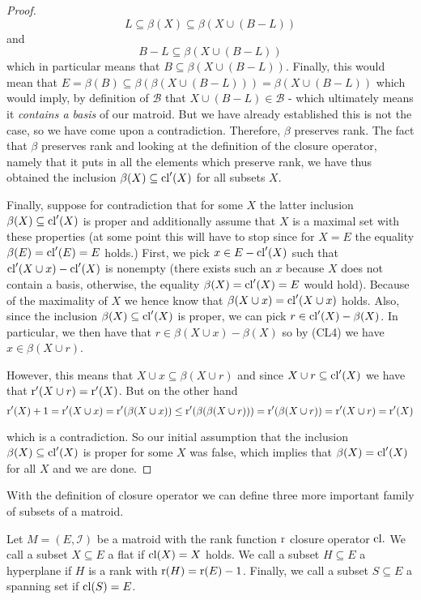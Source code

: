 \begin{proof}
$$L \subseteq \beta(X) \subseteq \beta(X \cup (B-L))$$ and $$B-L \subseteq \beta(X \cup (B-L))$$ which in particular means that $B \subseteq \beta(X \cup (B-L))$. Finally, this would mean that  
$E = \beta(B)\subseteq \beta(\beta(X \cup (B-L))) = \beta(X \cup (B-L))$ which would imply, by definition of $\mathcal{B}$ that $X \cup (B-L)
\in \mathcal{B}$ - which ultimately means it \textit{contains a basis} of our matroid. But we have already established this is not the case, so we have come upon a contradiction. Therefore, $\beta$ preserves rank.
The fact that $\beta$ preserves rank and looking at the definition of the closure operator, namely that it puts in all the elements which preserve rank, we have thus obtained the inclusion $\beta(X) \subseteq \mathrm{cl}'(X)$ for all subsets $X.$

Finally, suppose for contradiction that for some $X$ the latter inclusion $\beta(X) \subseteq \mathrm{cl}'(X)$ is proper and additionally assume that $X$ is a maximal set with these properties (at some point this will have to stop since for $X =E$ the equality $\beta(E) = \mathrm{cl}'(E) = E$ holds.) First, we pick $x \in E - \mathrm{cl}'(X)$ such that $\mathrm{cl}'(X\cup x) - \mathrm{cl}'(X)$ is nonempty (there exists such an $x$ because $X$ does not contain a basis, otherwise, the equality $\beta(X) = \mathrm{cl}'(X) = E$ would hold).
Because of the maximality of $X$ we hence know that $\beta(X\cup x) = \mathrm{cl}'(X \cup x)$ holds. Also, since the inclusion $\beta(X) \subseteq \mathrm{cl}'(X)$ is proper, we can pick $r \in \mathrm{cl}'(X) - \beta(X)$. In particular, we then have that $r \in \beta(X\cup x) - \beta(X)$ so by (CL4) we have $x \in \beta(X\cup r)$.

However, this means that $X \cup x \subseteq \beta(X\cup r)$ and since $X\cup r \subseteq \mathrm{cl}'(X)$ we have that $\operatorname{r}'(X\cup r) = 
\operatorname{r}'(X)$. But on the other hand $$\operatorname{r}'(X) + 1= \operatorname{r}'(X\cup x) = \operatorname{r}'(\beta(X\cup x))\leq \operatorname{r}'(\beta(\beta(X\cup r))) = \operatorname{r}'(\beta(X\cup r)) = \operatorname{r}'(X\cup r) = \operatorname{r}'(X)$$

which is a contradiction. So our initial assumption that the inclusion $\beta(X) \subseteq \mathrm{cl}'(X)$ is proper for some $X$ was false, which implies that $\beta(X) = \mathrm{cl}'(X)$ for all $X$ and we are done.

\end{proof}


With the definition of closure operator we can define three more important family of subsets of a matroid.

\begin{defn}\label{HP&SS}
    Let $M = (E, \mathcal{I})$ be a matroid with the rank function $\operatorname{r}$ closure operator $\mathrm{cl}.$ We call a subset $X \subseteq E$ a flat if $\mathrm{cl}(X) = X$ holds. We call a subset $H \subseteq E$ a hyperplane if $H$ is a rank with $\operatorname{r}(H) = \operatorname{r}(E)-1$. Finally, we call a subset $S \subseteq E$ a spanning set if $\mathrm{cl}(S) = E$.
\end{defn}


